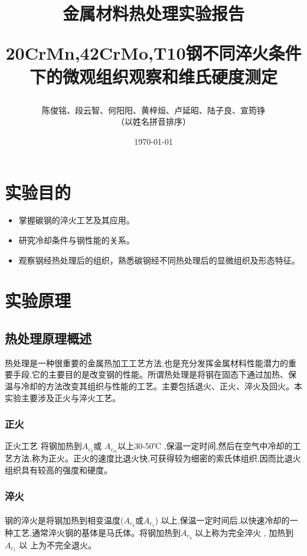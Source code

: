\documentclass[12pt]{ctexart}
\begin{document}
\title{ \bfseries 金属材料热处理实验报告\\
\begin{large}
20CrMn,42CrMo,T10钢不同淬火条件下的微观组织观察和维氏硬度测定
\end{large}}
\author{陈俊铭、段云智、何阳阳、黄梓烜、卢延昭、陆子良、宣筠铮\\（以姓名拼音排序）}
\date{\today}


\maketitle
\newpage
\thispagestyle{empty}
\tableofcontents
\newpage
\setcounter{page}{1}

\section{实验目的}
\begin{itemize}
\item 掌握碳钢的淬火工艺及其应用。
\item 研究冷却条件与钢性能的关系。
\item 观察钢经热处理后的组织，熟悉碳钢经不同热处理后的显微组织及形态特征。
\end{itemize}

\section{实验原理}
\subsection{热处理原理概述}
热处理是一种很重要的金属热加工工艺方法,也是充分发挥金属材料性能潜力的重要手段,它的主要目的是改变钢的性能。所谓热处理是将钢在固态下通过加热、保温与冷却的方法改变其组织与性能的工艺。主要包括退火、正火、淬火及回火。本实验主要涉及正火与淬火工艺。
\subsubsection{正火}
正火工艺 将钢加热到${A_{{c_3}}}$或 ${A_{{c_m}}}$以上30-50℃ ,保温一定时间,然后在空气中冷却的工艺方法,称为正火。正火的速度比退火快,可获得较为细密的索氏体组织,因而比退火组织具有较高的强度和硬度。
\subsubsection{淬火}
\paragraph{}
 钢的淬火是将钢加热到相变温度(${A_{{c_3}}}$或${A_{{c_1}}}$) 以上,保温一定时间后,以快速冷却的一种工艺,通常淬火钢的基体是马氏体。将钢加热到${A_{{c_3}}}$ 以上称为完全淬火 , 加热到${A_{{c_1}}}$ 以 上为不完全退火。
\end{document}
